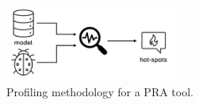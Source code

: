 \begin{figure}[h!]
    \centering
    \includegraphics[width=0.5\textwidth]{3_identifying_gaps/benchmarking/profiling_methods/figures/profiling.png}
    \caption{Profiling methodology for a PRA tool.}
    \label{fig:profiling}
\end{figure}